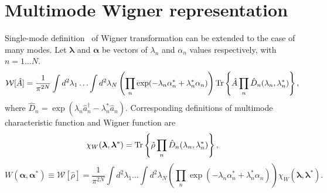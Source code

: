 \section{Multimode Wigner representation}


Single-mode definition~ of Wigner transformation can be extended to the case of many modes.
Let $\bm{\lambda}$ and $\bm{\alpha}$ be vectors of $\lambda_n$ and $\alpha_n$ values respectively,
with $n = 1 \ldots N$.
\begin{equation}
\label{eqn:formalism:mm-wigner:w-transformation}
	\mathcal{W}[\hat{A}]
	= \frac{1}{\pi^{2N}} \int d^2 \lambda_1 \ldots \int d^2 \lambda_N
		\left(
			\prod\limits_n \exp(-\lambda_n \alpha_n^* + \lambda_n^* \alpha_n)
		\right)
		\mathrm{Tr} \left\{ 
			\hat{A}
			\prod\limits_n \hat{D}_n (\lambda_n, \lambda_n^*)
		 \right\},
\end{equation}
where $\hat{D}_n = \exp(\lambda_n \hat{a}_n^\dagger - \lambda_n^* \hat{a}_n)$.
Corresponding definitions of multimode characteristic function and Wigner function are
\[
	\chi_W (\bm{\lambda}, \bm{\lambda}^*)
	= \mathrm{Tr} \left\{ 
		\hat{\rho}
		\prod\limits_n \hat{D}_n (\lambda_n, \lambda_n^*)
	 \right\},
\]
\begin{equation}
\label{eqn:formalism:mm-wigner:w-definition}
	W (\bm{\alpha}, \bm{\alpha}^*)
	\equiv \mathcal{W}[\hat{\rho}]
	= \frac{1}{\pi^{2N}} \int d^2 \lambda_1 \ldots \int d^2 \lambda_N
		\left(
			\prod\limits_n \exp(-\lambda_n \alpha_n^* + \lambda_n^* \alpha_n)
		\right)
		\chi_W (\bm{\lambda}, \bm{\lambda}^*).
\end{equation}

